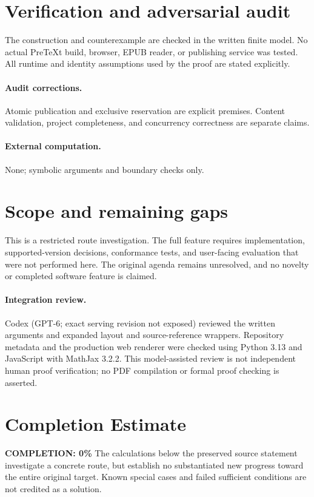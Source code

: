 \documentclass[11pt]{article}
\begin{document}
\section{Verification and adversarial audit}
The construction and counterexample are checked in the written finite model. No actual PreTeXt build, browser, EPUB reader, or publishing service was tested. All runtime and identity assumptions used by the proof are stated explicitly.
\paragraph{Audit corrections.} Atomic publication and exclusive reservation are explicit premises. Content validation, project completeness, and concurrency correctness are separate claims.
\paragraph{External computation.} None; symbolic arguments and boundary checks only.
\section{Scope and remaining gaps}
This is a restricted route investigation. The full feature requires implementation, supported-version decisions, conformance tests, and user-facing evaluation that were not performed here. The original agenda remains unresolved, and no novelty or completed software feature is claimed.
\paragraph{Integration review.} Codex (GPT-6; exact serving revision not exposed) reviewed the written arguments and expanded layout and source-reference wrappers. Repository metadata and the production web renderer were checked using Python 3.13 and JavaScript with MathJax 3.2.2. This model-assisted review is not independent human proof verification; no PDF compilation or formal proof checking is asserted.

\section{Completion Estimate}
\noindent\textbf{COMPLETION: 0\%}
The calculations below the preserved source statement investigate a concrete route,
but establish no substantiated new progress toward the entire original target.
Known special cases and failed sufficient conditions are not credited as a solution.
\end{document}
